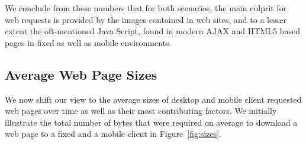 \documentclass[journal,final]{IEEEtran}
\begin{document}
We conclude from these numbers that for both scenarios, the main culprit for web requests is provided by the images contained in web sites, and to a lesser extent the oft-mentioned Java Script, found in modern AJAX and HTML5 based pages in fixed as well as mobile environments.

\subsection{Average Web Page Sizes}
\label{ss:bytes}
We now shift our view to the average sizes of desktop and mobile client requested web pages over time as well as their most contributing factors.
We initially illustrate the total number of bytes that were required on average to download a web page to a fixed and a mobile client in Figure~\ref{fig:sizes}.
\begin{figure}
	\centering
	\qquad
	\\
	\qquad

\end{figure}
\end{document}
